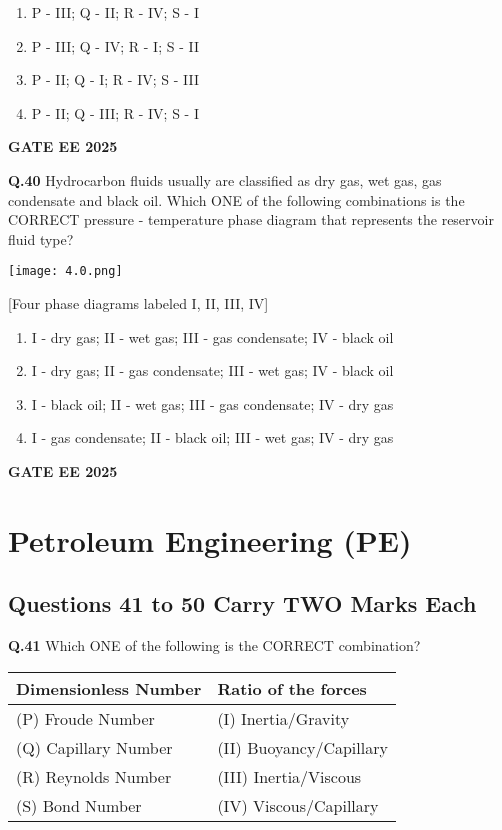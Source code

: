 \documentclass{article}
\begin{document}
\begin{enumerate}[label=(\Alph*)]
    \item P - III; Q - II; R - IV; S - I
    \item P - III; Q - IV; R - I; S - II
    \item P - II; Q - I; R - IV; S - III
    \item P - II; Q - III; R - IV; S - I
\end{enumerate}
\textbf{GATE EE 2025}

\vspace{0.5cm}

\textbf{Q.40} Hydrocarbon fluids usually are classified as dry gas, wet gas, gas condensate and black oil. Which ONE of the following combinations is the CORRECT pressure - temperature phase diagram that represents the reservoir fluid type?

\texttt{[image: 4.0.png]}

[Four phase diagrams labeled I, II, III, IV]

\begin{enumerate}[label=(\Alph*)]
    \item I - dry gas; II - wet gas; III - gas condensate; IV - black oil
    \item I - dry gas; II - gas condensate; III - wet gas; IV - black oil
    \item I - black oil; II - wet gas; III - gas condensate; IV - dry gas
    \item I - gas condensate; II - black oil; III - wet gas; IV - dry gas
\end{enumerate}
\textbf{GATE EE 2025}

\vspace{0.5cm}

\section*{Petroleum Engineering (PE)}

\subsection*{Questions 41 to 50 Carry TWO Marks Each}

\textbf{Q.41} Which ONE of the following is the CORRECT combination?

\begin{tabular}{|l|l|}
\hline
Dimensionless Number & Ratio of the forces \\
\hline
(P) Froude Number & (I) Inertia/Gravity \\
(Q) Capillary Number & (II) Buoyancy/Capillary \\
(R) Reynolds Number & (III) Inertia/Viscous \\
(S) Bond Number & (IV) Viscous/Capillary \\
\hline
\end{tabular}
\end{document}

